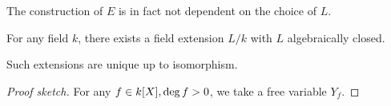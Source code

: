The construction of $E$ is in fact not dependent on the choice of $L$.

\begin{thm}[]
  For any field $k$, there exists a field extension $L/k$ with $L$ algebraically closed.

  Such extensions are unique up to isomorphism.
\end{thm}
\begin{proof}[Proof sketch]
  For any $f \in k[X], \operatorname{deg} f >0$, we take a free variable $Y_f$.
\end{proof}



